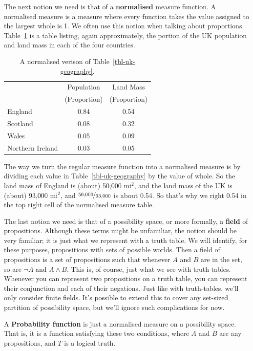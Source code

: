 \documentclass[
  11pt,
  letterpaper,
]{scrbook}
\begin{document}
The next notion we need is that of a \textbf{normalised} measure
function. A normalised measure is a measure where every function takes
the value assigned to the largest whole is 1. We often use this notion
when talking about proportions. Table~\ref{tbl-uk-geography-normal} is a
table listing, again approximately, the portion of the UK population and
land mass in each of the four countries.

\begin{longtable}[]{@{}lcc@{}}
\caption{A normalised verison of
Table~\ref{tbl-uk-geography}.}\label{tbl-uk-geography-normal}\tabularnewline
\toprule\noalign{}
\endfirsthead
\endhead
\bottomrule\noalign{}
\endlastfoot
& Population & Land Mass \\
& (Proportion) & (Proportion) \\
England & 0.84 & 0.54 \\
Scotland & 0.08 & 0.32 \\
Wales & 0.05 & 0.09 \\
Northern Ireland & 0.03 & 0.05 \\
\end{longtable}

The way we turn the regular measure function into a normalised measure
is by dividing each value in Table~\ref{tbl-uk-geography} by the value
of whole. So the land mass of England is (about) 50,000 mi\(^2\), and
the land mass of the UK is (about) 93,000 mi\(^2\), and
\(\nicefrac{50,000}{93,000}\) is about 0.54. So that's why we right 0.54
in the top right cell of the normalised measure table.

The last notion we need is that of a possibility space, or more
formally, a \textbf{field} of propositions. Although these terms might
be unfamiliar, the notion should be very familiar; it is just what we
represent with a truth table. We will identify, for these purposes,
propositions with sets of possible worlds. Then a field of propositions
is a set of propositions such that whenever \(A\) and \(B\) are in the
set, so are \(\neg A\) and \(A \wedge B\). This is, of course, just what
we see with truth tables. Whenever you can represent two propositions on
a truth table, you can represent their conjunction and each of their
negations. Just like with truth-tables, we'll only consider finite
fields. It's possible to extend this to cover any set-sized partition of
possibility space, but we'll ignore such complications for now.

A \textbf{Probability function} is just a normalised measure on a
possibility space. That is, it is a function satisfying these two
conditions, where \(A\) and \(B\) are any propositions, and \(T\) is a
logical truth.
\end{document}
